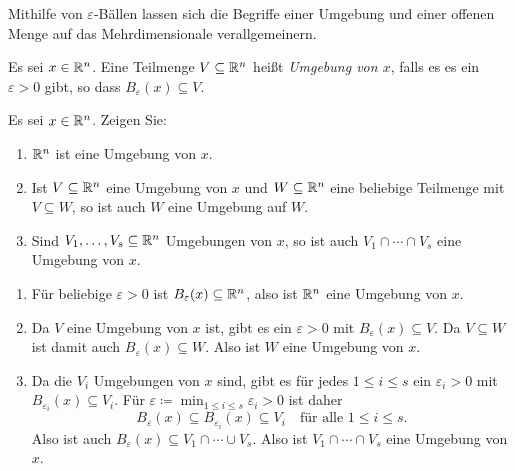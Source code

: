 \documentclass[a4paper,10pt]{article}
\begin{document}
Mithilfe von $\varepsilon$-Bällen lassen sich die Begriffe einer Umgebung und einer offenen Menge auf das Mehrdimensionale verallgemeinern.


\begin{defi}
 Es sei $x \in \mathbb{R}^n$. Eine Teilmenge $V \subseteq \mathbb{R}^n$ heißt \emph{Umgebung von $x$}, falls es es ein $\varepsilon > 0$ gibt, so dass $B_\varepsilon(x) \subseteq V$.
\end{defi}


\begin{question}\label{qst: Eigenschaften von Umgebungen}
 Es sei $x \in \mathbb{R}^n$. Zeigen Sie:
 \begin{enumerate}
  \item
   $\mathbb{R}^n$ ist eine Umgebung von $x$.
  \item
   Ist $V \subseteq \mathbb{R}^n$ eine Umgebung von $x$ und $W \subseteq \mathbb{R}^n$ eine beliebige Teilmenge mit $V \subseteq W$, so ist auch $W$ eine Umgebung auf $W$.
  \item
   Sind $V_1, \dotsc, V_s \subseteq \mathbb{R}^n$ Umgebungen von $x$, so ist auch $V_1 \cap \dotsb \cap V_s$ eine Umgebung von $x$.
 \end{enumerate}
\end{question}
\begin{solution}
 \begin{enumerate}
  \item
   Für beliebige $\varepsilon > 0$ ist $B_\varepsilon(x) \subseteq \mathbb{R}^n$, also ist $\mathbb{R}^n$ eine Umgebung von $x$.
  \item
   Da $V$ eine Umgebung von $x$ ist, gibt es ein $\varepsilon > 0$ mit $B_\varepsilon(x) \subseteq V$. Da $V \subseteq W$ ist damit auch $B_\varepsilon(x) \subseteq W$. Also ist $W$ eine Umgebung von $x$.
  \item
   Da die $V_i$ Umgebungen von $x$ sind, gibt es für jedes $1 \leq i \leq s$ ein $\varepsilon_i  > 0$ mit $B_{\varepsilon_i}(x) \subseteq V_i$. Für $\varepsilon \coloneqq \min_{1 \leq i \leq s} \varepsilon_i > 0$ ist daher
   \[
    B_\varepsilon(x) \subseteq B_{\varepsilon_i}(x) \subseteq V_i
    \quad \text{für alle $1 \leq i \leq s$}.
   \]
   Also ist auch $B_\varepsilon(x) \subseteq V_1 \cap \dotsb \cup V_s$. Also ist $V_1 \cap \dotsb \cap V_s$ eine Umgebung von $x$.
 \end{enumerate}
\end{solution}
\end{document}
